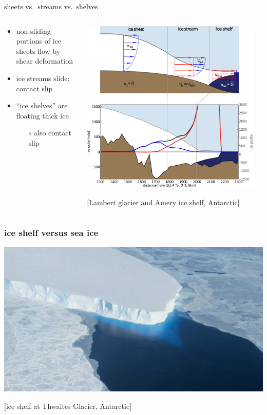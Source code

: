 \documentclass[10pt,hyperref={pdfpagelabels=true}]{beamer}
\newcommand{\contactslipslide}{
\begin{frame}{sheets vs.~streams vs.~shelves}

\begin{columns}
\begin{column}{0.35\textwidth}
\small
\begin{itemize}
\small
\item non-sliding portions of ice sheets flow by shear deformation
\item ice streams slide: \alert{contact slip}
\item ``ice shelves'' are floating thick ice
  \begin{itemize}
  \scriptsize
  \item[$\circ$] also \alert{contact slip}
  \end{itemize}
\end{itemize}
\end{column}

\begin{column}{0.65\textwidth}

\hfill\includegraphics[width=0.95\textwidth]{siassacartoon-lambert}

\begin{center}
\vspace{-0.18in}
\tiny [Lambert glacier and Amery ice shelf, Antarctic]
\end{center}
\end{column}
\end{columns}
\end{frame}
}
\begin{document}
\contactslipslide


\begin{frame}
  \frametitle{ice shelf versus sea ice}

\begin{center}
\vspace{-0.2in}

\includegraphics[width=1.0\textwidth]{supp4rignot-small}

\medskip
\tiny [ice shelf at Thwaites Glacier, Antarctic]
\end{center}
\end{frame}
\end{document}
